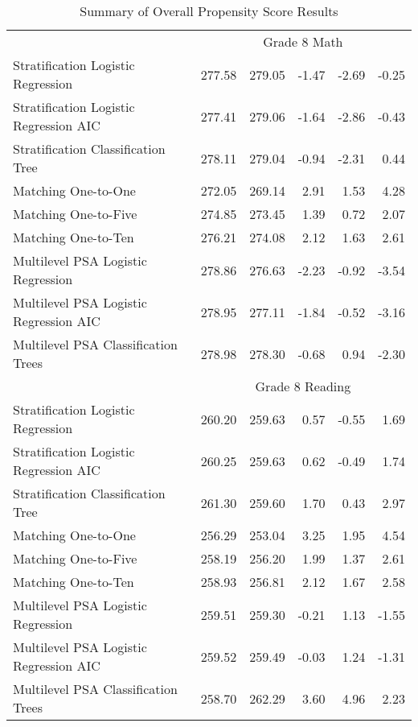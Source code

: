 \begin{table}[ht]
\begin{tabular}{lrrrrr}
    \hline & \multicolumn{5}{c}{Grade 8 Math} \\ \cline{2-6} Stratification Logistic Regression & 277.58 & 279.05 & -1.47 & -2.69 & -0.25 \\ 
  Stratification Logistic Regression AIC & 277.41 & 279.06 & -1.64 & -2.86 & -0.43 \\ 
  Stratification Classification Tree & 278.11 & 279.04 & -0.94 & -2.31 & 0.44 \\ 
  Matching One-to-One & 272.05 & 269.14 & 2.91 & 1.53 & 4.28 \\ 
  Matching One-to-Five & 274.85 & 273.45 & 1.39 & 0.72 & 2.07 \\ 
  Matching One-to-Ten & 276.21 & 274.08 & 2.12 & 1.63 & 2.61 \\ 
  Multilevel PSA Logistic Regression & 278.86 & 276.63 & -2.23 & -0.92 & -3.54 \\ 
  Multilevel PSA Logistic Regression AIC & 278.95 & 277.11 & -1.84 & -0.52 & -3.16 \\ 
  Multilevel PSA Classification Trees & 278.98 & 278.30 & -0.68 & 0.94 & -2.30 \\ 
    \hline & \multicolumn{5}{c}{Grade 8 Reading} \\ \cline{2-6} Stratification Logistic Regression & 260.20 & 259.63 & 0.57 & -0.55 & 1.69 \\ 
  Stratification Logistic Regression AIC & 260.25 & 259.63 & 0.62 & -0.49 & 1.74 \\ 
  Stratification Classification Tree & 261.30 & 259.60 & 1.70 & 0.43 & 2.97 \\ 
  Matching One-to-One & 256.29 & 253.04 & 3.25 & 1.95 & 4.54 \\ 
  Matching One-to-Five & 258.19 & 256.20 & 1.99 & 1.37 & 2.61 \\ 
  Matching One-to-Ten & 258.93 & 256.81 & 2.12 & 1.67 & 2.58 \\ 
  Multilevel PSA Logistic Regression & 259.51 & 259.30 & -0.21 & 1.13 & -1.55 \\ 
  Multilevel PSA Logistic Regression AIC & 259.52 & 259.49 & -0.03 & 1.24 & -1.31 \\ 
  Multilevel PSA Classification Trees & 258.70 & 262.29 & 3.60 & 4.96 & 2.23 \\ 
   \hline
\end{tabular}
\caption{Summary of Overall Propensity Score Results} 
\label{tab:overall}
\end{table}
